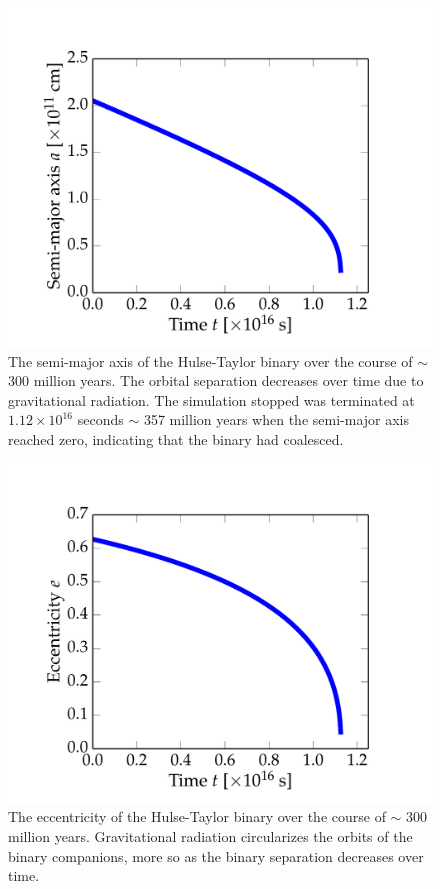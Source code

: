 \documentclass[preprint2]{aastex}
\begin{document}
\begin{figure}[t!]
\vspace{-0.24cm}
\centering
\hspace*{-1cm}\includegraphics[width=1.2\textwidth]{billion_figs/semi-major-axis.pdf}
\caption{The semi-major axis of the Hulse-Taylor binary over the course of \(\sim\) 300 million years. The orbital separation decreases over time due to gravitational radiation. The simulation stopped was terminated at \(1.12 \times 10^{16}\) seconds \(\sim\) 357 million years when the semi-major axis reached zero, indicating that the binary had coalesced.}
\label{billion-axis}
\end{figure}

\begin{figure}[t!]
\vspace{-0.24cm}
\centering
\hspace*{-1cm}\includegraphics[width=1.2\textwidth]{billion_figs/eccentricity.pdf}
\caption{The eccentricity of the Hulse-Taylor binary over the course of \(\sim\) 300 million years. Gravitational radiation circularizes the orbits of the binary companions, more so as the binary separation decreases over time.}
\label{billion-ecc}
\end{figure}
\end{document}

